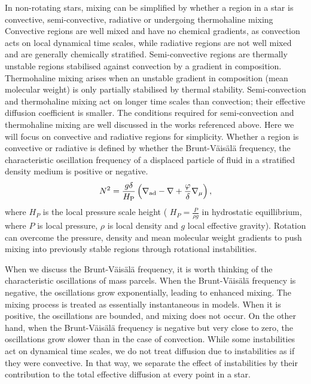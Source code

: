 In non-rotating stars, mixing can be simplified by whether a region in a star is convective, semi-convective, radiative or undergoing thermohaline mixing \citep[These concepts will not be discussed at length in this work. See][ for good overviews of these concepts.]{maeder_evolution_2000,tassoul_stellar_2000}
Convective regions are well mixed and have no chemical gradients, as convection acts on local dynamical time scales, while radiative regions are not well mixed and are generally chemically stratified.
Semi-convective regions are thermally unstable regions stabilised against convection by a gradient in composition.
Thermohaline mixing arises when an unstable gradient in composition (mean molecular weight) is only partially stabilised by thermal stability.
Semi-convection and thermohaline mixing act on longer time scales than convection; their effective diffusion coefficient is smaller.
The conditions required for semi-convection and thermohaline mixing are well discussed in the works referenced above.
Here we will focus on convective and radiative regions for simplicity.
Whether a region is convective or radiative is defined by whether the Brunt-V\"{a}is\"{a}l\"{a} frequency, the characteristic oscillation frequency of a displaced particle of fluid in a stratified density medium is positive or negative.
\begin{equation}
    N^2 = \frac{g \delta}{H_\textnormal{P}}\left(\nabla_{\textnormal{ad}} - \nabla + \frac{\varphi}{\delta} \nabla_{\mu}\right), 
\end{equation}
where $H_P$ is the local pressure scale height ( $H_{P
} = \frac{P}{\rho g}$ in hydrostatic equillibrium, where $P$ is local pressure, $\rho$ is local density and $g$ local effective gravity).
Rotation can overcome the pressure, density and mean molecular weight gradients to push mixing into previously stable regions through rotational instabilities.

When we discuss the Brunt-V\"{a}is\"{a}l\"{a} frequency, it is worth thinking of the characteristic oscillations of mass parcels.
When the Brunt-V\"{a}is\"{a}l\"{a} frequency is negative, the oscillations grow exponentially, leading to enhanced mixing.
The mixing process is treated as essentially instantaneous in models.
When it is positive, the oscillations are bounded, and mixing does not occur.
On the other hand, when the Brunt-V\"{a}is\"{a}l\"{a} frequency is negative but very close to zero, the oscillations grow slower than in the case of convection.
While some instabilities act on dynamical time scales, we do not treat diffusion due to instabilities as if they were convective.
In that way, we separate the effect of instabilities by their contribution to the total effective diffusion at every point in a star.

